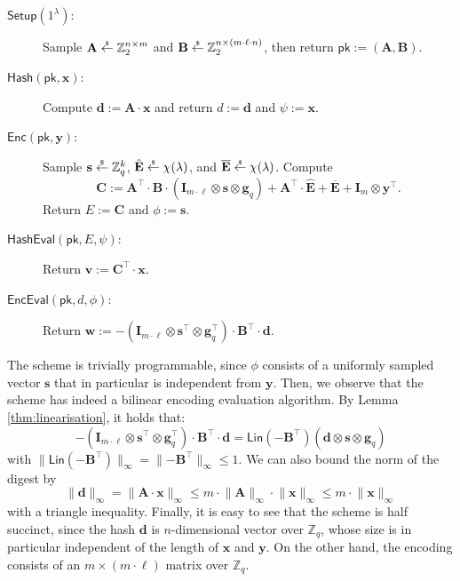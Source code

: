 \documentclass{article}
\newcommand{\getsr}{\overset{\raisebox{-1pt}{$\scriptscriptstyle \$$}}{\gets}}
\newcommand{\sample}{\getsr}
\newcommand{\Z}{\mathbb{Z}}
\renewcommand{\sec}{\ensuremath{\lambda}}
\newcommand{\secpar}{\sec}
\newcommand{\algofont}[1]{\ensuremath{\mathsf{#1}}}
\newcommand{\Enc}{{\algofont{Enc}}}
\newcommand{\Setup}{{\algofont{Setup}}}
\newcommand{\Eval}{\algofont{Eval}\xspace}
\newcommand{\Hash}{{\algofont{Hash}}}
\newcommand{\id}{\ensuremath{\mathbf{I}}}
\newcommand{\pk}{{\mathsf{pk}}}
\newenvironment{protocol}[1][]
{\begin{algorithm}\caption{#1}}
  {\end{algorithm}}
\begin{document}
\begin{protocol}[Half-Succinct NI-OTE]\label{prot:HCVOLE}

\begin{description}
\item[$\Setup(1^\secpar)$:] Sample $\mathbf{A} \sample \Z_2^{n \times m}$ and $\mathbf{B} \sample \Z_2^{n\times (m \cdot \ell\cdot n)}$, then return $\pk:=(\mathbf{A}, \mathbf{B})$.


\item[$\Hash(\pk, \mathbf{x})$:] Compute $\mathbf{d}:= \mathbf{A}\cdot \mathbf{x}$ and return $d:=\mathbf{d}$ and $\psi:=\mathbf{x}$.


\item[$\Enc(\pk, \mathbf{y})$:] Sample $\mathbf{s}\sample \Z_q^k$, $\hat{\mathbf{E}}\sample\chi(\sec)$, 
and $\overline{\mathbf{E}}\sample\chi(\sec)$. Compute 
\[\mathbf{C}:= \mathbf{A}^\intercal \cdot \mathbf{B}\cdot (\id_{m\cdot \ell}\otimes \mathbf{s}\otimes \mathbf{g}_q)+ \mathbf{A}^\intercal\cdot \hat{\mathbf{E}}+ \overline{\mathbf{E}}+ \id_{m} \otimes \mathbf{y}^\intercal.\]
Return $E:=\mathbf{C}$ and $\phi:=\mathbf{s}$.


\item[$\Hash\Eval(\pk, E, \psi)$:] Return $\mathbf{v}:=\mathbf{C}^\intercal\cdot \mathbf{x}$.

\item[$\Enc\Eval(\pk, d, \phi)$:] Return $\mathbf{w}:= -(\id_{m\cdot \ell}\otimes \mathbf{s}^\intercal\otimes \mathbf{g}_q^\intercal) \cdot \mathbf{B}^\intercal\cdot \mathbf{d}$.
\end{description}
\end{protocol}
The scheme is trivially programmable, since $\phi$ consists of a uniformly sampled vector $\mathbf{s}$ that in particular is independent from $\mathbf{y}$.
Then, we observe that the scheme has indeed a bilinear encoding evaluation algorithm. By Lemma \ref{thm:linearisation}, it holds that:
\begin{equation}\label{eq:bilinear}
-(\id_{m\cdot \ell}\otimes \mathbf{s}^\intercal\otimes \mathbf{g}_q^\intercal) \cdot \mathbf{B}^\intercal\cdot \mathbf{d} 
=
\mathsf{Lin}(-\mathbf{B}^\intercal) (\mathbf{d}\otimes \mathbf{s}\otimes \mathbf{g}_q)
\end{equation}
with $\lVert \mathsf{Lin}(-\mathbf{B}^\intercal)\rVert_\infty=\lVert -\mathbf{B}^\intercal\rVert_\infty\le 1$. We can also bound the norm of the digest by 
\begin{equation}\label{eq:bound_d}
    \lVert \mathbf{d}\rVert_\infty=\lVert \mathbf{A}\cdot \mathbf{x}\rVert_\infty\le m\cdot \lVert \mathbf{A}\rVert_\infty\cdot \lVert \mathbf{x}\rVert_\infty\le m\cdot \lVert \mathbf{x}\rVert_\infty
\end{equation}
with a triangle inequality. Finally, it is easy to see that the scheme is half succinct, since the hash $\mathbf{d}$ is $n$-dimensional vector over $\Z_q$, whose size is in particular independent of the length of $\mathbf{x}$ and $\mathbf{y}$. On the other hand, the encoding consists of an $m\times (m\cdot \ell)$ matrix over $\Z_q$. 
\end{document}
